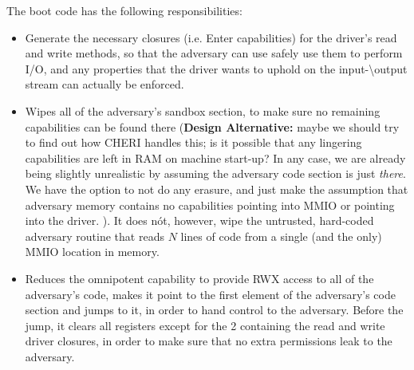 \documentclass{article}
\begin{document}
The boot code has the following responsibilities:
\begin{itemize}
\item Generate the necessary closures (i.e. Enter capabilities) for the driver's read and write methods, so that the adversary can use safely use them to perform I/O, and any properties that the driver wants to uphold on the input-\textbackslash output stream can actually be enforced.
\item Wipes all of the adversary's sandbox section, to make sure no remaining
  capabilities can be found there (\textbf{Design Alternative:} maybe we should try to find out how CHERI handles this; is it possible that any lingering capabilities are left in RAM
  on machine start-up? In any case, we are already being slightly unrealistic by assuming the adversary code section is just \emph{there}. We have the option
  to not do any erasure, and just make the assumption that adversary memory
  contains no capabilities pointing into MMIO or pointing into the driver. ).
  It does n\'ot, however, wipe the untrusted, hard-coded adversary routine that reads $N$ lines of code from a single (and the only) MMIO location in memory.
\item Reduces the omnipotent capability to provide RWX access to all of the
  adversary's code, makes it point to the first element of the adversary's code
  section and jumps to it, in order to hand control to the adversary. Before the
  jump, it clears all registers except for the 2 containing the read and write
  driver closures, in order to make sure that no extra permissions leak to the adversary.
\end{itemize}




\appendix
\end{document}
